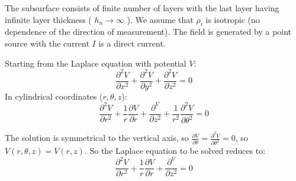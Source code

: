 The subsurface consists of finite number of layers with the last layer having infinite layer thickness ( $h_n\rightarrow\infty$ ). We assume that $\rho_i$ is isotropic (no dependence of the direction of measurement). The field is generated by a point source with the current $I$ is a direct current.

Starting from the Laplace equation with potential $V$:
\begin{equation}
\frac{\partial^2 V}{\partial x^2}+\frac{\partial^2 V}{\partial y^2}+\frac{\partial^2 V}{\partial z^2}=0
\end{equation}
In cylindrical coordinates ($r,\theta,z$):
\begin{equation}
\frac{\partial^2 V}{\partial r^2}+\frac{1}{r}\frac{\partial V}{\partial r}+\frac{\partial^ V}{\partial z^2}+\frac{1}{r^2}\frac{\partial^2 V}{\partial\theta^2}=0
\end{equation}

The solution is symmetrical to the vertical axis, so $\frac{\partial V}{\partial \theta}=\frac{\partial^2 V}{\partial\theta^2}=0$, so $V(r,\theta,z)=V(r,z)$. So the Laplace equation to be solved reduces to:
\begin{equation}
\frac{\partial^2 V}{\partial r^2}+\frac{1}{r}\frac{\partial V}{\partial r}+\frac{\partial^ V}{\partial z^2}=0
\end{equation}


